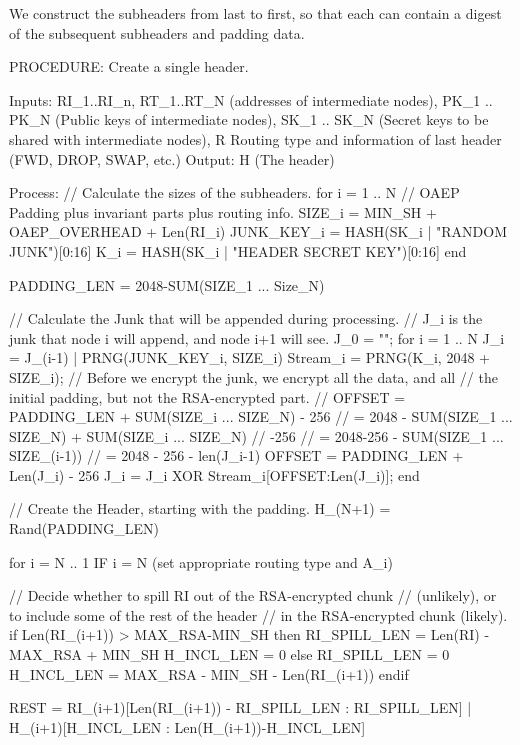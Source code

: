 We construct the subheaders from last to first, so that each can contain
a digest of the subsequent subheaders and padding data.

PROCEDURE: Create a single header.

Inputs: RI_1..RI_n, RT_1..RT_N (addresses of intermediate nodes), 
        PK_1 .. PK_N (Public keys of intermediate nodes),
        SK_1 .. SK_N (Secret keys to be shared with intermediate nodes),
        R Routing type and information of last header (FWD, DROP, SWAP, etc.)
Output: H (The header)

Process: 
  // Calculate the sizes of the subheaders.
  for i = 1 .. N
        // OAEP Padding plus invariant parts plus routing info.
        SIZE_i = MIN_SH + OAEP_OVERHEAD + Len(RI_i)
        JUNK_KEY_i = HASH(SK_i | "RANDOM JUNK")[0:16]
        K_i = HASH(SK_i | "HEADER SECRET KEY")[0:16]
  end

  PADDING_LEN = 2048-SUM(SIZE_1 ... Size_N)

  // Calculate the Junk that will be appended during processing.
  // J_i is the junk that node i will append, and node i+1 will see.
  J_0 = "";
  for i = 1 .. N
        J_i = J_(i-1) | PRNG(JUNK_KEY_i, SIZE_i)
        Stream_i = PRNG(K_i, 2048 + SIZE_i);
        // Before we encrypt the junk, we encrypt all the data, and all
        // the initial padding, but not the RSA-encrypted part.
        //    OFFSET = PADDING_LEN + SUM(SIZE_i ... SIZE_N) - 256
        //           = 2048 - SUM(SIZE_1 ... SIZE_N) + SUM(SIZE_i ... SIZE_N)
        //             -256
        //           = 2048-256 - SUM(SIZE_1 ... SIZE_(i-1))
        //           = 2048 - 256 - len(J_{i-1})
        OFFSET = PADDING_LEN  + Len(J_i) - 256
        J_i = J_i XOR Stream_i[OFFSET:Len(J_i)];
  end

  // Create the Header, starting with the padding.
  H_(N+1) = Rand(PADDING_LEN)

  for i = N .. 1
        IF i = N (set appropriate routing type and A_i)

        // Decide whether to spill RI out of the RSA-encrypted chunk
        // (unlikely), or to include some of the rest of the header
        // in the RSA-encrypted chunk (likely).
        if Len(RI_(i+1)) > MAX_RSA-MIN_SH then
             RI_SPILL_LEN = Len(RI) - MAX_RSA + MIN_SH
             H_INCL_LEN = 0
        else
             RI_SPILL_LEN = 0
             H_INCL_LEN = MAX_RSA - MIN_SH - Len(RI_(i+1))
        endif

        REST = RI_(i+1)[Len(RI_(i+1)) - RI_SPILL_LEN : RI_SPILL_LEN]
               | H_(i+1)[H_INCL_LEN : Len(H_(i+1))-H_INCL_LEN]

